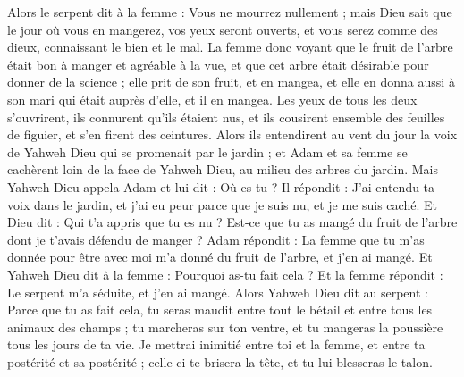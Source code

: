 \begin{multicols}{2}
Alors le serpent dit à la femme : Vous ne mourrez nullement ;
mais Dieu sait que le jour où vous en mangerez, vos yeux seront ouverts, et vous serez comme des dieux, connaissant le bien et le mal.
La femme donc voyant que le fruit de l'arbre était bon à manger et agréable à la vue, et que cet arbre était désirable pour donner de la science ; elle prit de son fruit, et en mangea, et elle en donna aussi à son mari qui était auprès d’elle, et il en mangea.
Les yeux de tous les deux s’ouvrirent, ils connurent qu'ils étaient nus, et ils cousirent ensemble des feuilles de figuier, et s'en firent des ceintures.
Alors ils entendirent au vent du jour la voix de Yahweh Dieu qui se promenait par le jardin ; et Adam et sa femme se cachèrent loin de la face de Yahweh Dieu, au milieu des arbres du jardin.
Mais Yahweh Dieu appela Adam et lui dit : Où es-tu ?
Il répondit : J'ai entendu ta voix dans le jardin, et j'ai eu peur parce que je suis nu, et je me suis caché.
Et Dieu dit : Qui t'a appris que tu es nu ? Est-ce que tu as mangé du fruit de l'arbre dont je t'avais défendu de manger ?
Adam répondit : La femme que tu m'as donnée pour être avec moi m'a donné du fruit de l'arbre, et j'en ai mangé.
Et Yahweh Dieu dit à la femme : Pourquoi as-tu fait cela ? Et la femme répondit : Le serpent m'a séduite, et j'en ai mangé.
Alors Yahweh Dieu dit au serpent : Parce que tu as fait cela, tu seras maudit entre tout le bétail et entre tous les animaux des champs ; tu marcheras sur ton ventre, et tu mangeras la poussière tous les jours de ta vie.
Je mettrai inimitié entre toi et la femme, et entre ta postérité et sa postérité ; celle-ci te brisera la tête, et tu lui blesseras le talon.

\end{multicols}
